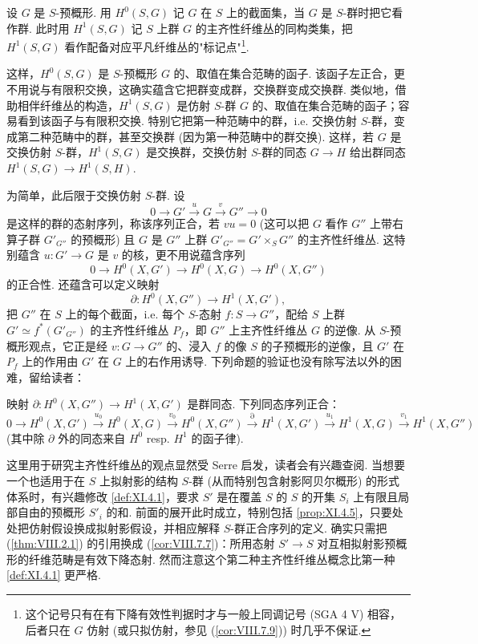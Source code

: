 \begin{definition}\label{def:XI.4.4}
设 $G$ 是 $S$-预概形. 用 $H^0(S, G)$ 记 $G$ 在 $S$ 上的截面集，当 $G$ 是 $S$-群时把它看作群. 此时用 $H^1(S, G)$ 记 $S$ 上群 $G$ 的主齐性纤维丛的同构类集，把 $H^1(S, G)$ 看作配备对应平凡纤维丛的"标记点"\footnote{这个记号只有在有下降有效性判据时才与一般上同调记号 (SGA 4 V) 相容，后者只在 $G$ 仿射 (或只拟仿射，参见 (\cref{cor:VIII.7.9})) 时几乎不保证.}.
\end{definition}

这样，$H^0(S, G)$ 是 $S$-预概形 $G$ 的、取值在集合范畴的函子. 该函子左正合，更不用说与有限积交换，这确实蕴含它把群变成群，交换群变成交换群. 类似地，借助相伴纤维丛的构造，$H^1(S, G)$ 是仿射 $S$-群 $G$ 的、取值在集合范畴的函子；容易看到该函子与有限积交换. 特别它把第一种范畴中的群，i.e. 交换仿射 $S$-群，变成第二种范畴中的群，甚至交换群 (因为第一种范畴中的群交换). 这样，若 $G$ 是交换仿射 $S$-群，$H^1(S, G)$ 是交换群，交换仿射 $S$-群的同态 $G \to H$ 给出群同态 $H^1(S, G) \to H^1(S, H)$.

为简单，此后限于交换仿射 $S$-群. 设
\[
0 \longrightarrow G' \xrightarrow{u} G \xrightarrow{v} G'' \longrightarrow 0
\]
是这样的群的态射序列，称该序列正合，若 $vu = 0$ (这可以把 $G$ 看作 $G''$ 上带右算子群 $G'_{G''}$ 的预概形) 且 $G$ 是 $G''$ 上群 $G'_{G''} = G' \times_S G''$ 的主齐性纤维丛. 这特别蕴含 $u \colon G' \to G$ 是 $v$ 的核，更不用说蕴含序列
\[
0 \longrightarrow H^0(X, G') \longrightarrow H^0(X, G) \longrightarrow H^0(X, G'')
\]
的正合性. 还蕴含可以定义映射
\[
\partial \colon H^0(X, G'') \longrightarrow H^1(X, G'),
\]
把 $G''$ 在 $S$ 上的每个截面，i.e. 每个 $S$-态射 $f \colon S \to G''$，配给 $S$ 上群 $G' \simeq f^{*}(G'_{G''})$ 的主齐性纤维丛 $P_f$，即 $G''$ 上主齐性纤维丛 $G$ 的逆像. 从 $S$-预概形观点，它正是经 $v \colon G \to G''$ 的、浸入 $f$ 的像 $S$ 的子预概形的逆像，且 $G'$ 在 $P_f$ 上的作用由 $G'$ 在 $G$ 上的右作用诱导. 下列命题的验证也没有除写法以外的困难，留给读者：

\begin{proposition}\label{prop:XI.4.5}
映射 $\partial \colon H^0(X, G'') \to H^1(X, G')$ 是群同态. 下列同态序列正合：
\[
0 \longrightarrow H^0(X, G') \xrightarrow{u_0} H^0(X, G) \xrightarrow{v_0} H^0(X, G'') \xrightarrow{\partial} H^1(X, G') \xrightarrow{u_1} H^1(X, G) \xrightarrow{v_1} H^1(X, G'')
\]
(其中除 $\partial$ 外的同态来自 $H^0$ resp. $H^1$ 的函子律).
\end{proposition}

\begin{remark}\label{rem:XI.4.6}
这里用于研究主齐性纤维丛的观点显然受 Serre \cite{exp11-7} 启发，读者会有兴趣查阅. 当想要一个也适用于在 $S$ 上拟射影的结构 $S$-群 (从而特别包含射影阿贝尔概形) 的形式体系时，有兴趣修改 \ref{def:XI.4.1}，要求 $S'$ 是在覆盖 $S$ 的 $S$ 的开集 $S_i$ 上有限且局部自由的预概形 $S'_i$ 的和. 前面的展开此时成立，特别包括 \ref{prop:XI.4.5}，只要处处把仿射假设换成拟射影假设，并相应解释 $S$-群正合序列的定义. 确实只需把 (\cref{thm:VIII.2.1}) 的引用换成 (\cref{cor:VIII.7.7})：所用态射 $S' \to S$ 对互相拟射影预概形的纤维范畴是有效下降态射. 然而注意这个第二种主齐性纤维丛概念比第一种 \ref{def:XI.4.1} 更严格.
\end{remark}

